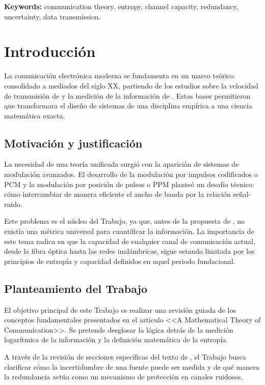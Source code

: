 \documentclass[11pt,a4paper,spanish]{book}
\begin{document}
\vspace{0.5cm}
{\bf Keywords:} communication theory, entropy, channel capacity, redundancy, uncertainty, data transmission.
\mainmatter

\chapter{Introducción}

La comunicación electrónica moderna se fundamenta en un marco teórico consolidado a mediados del siglo XX, partiendo de los estudios sobre la velocidad de transmisión de \citet{nyquist1928} y la medición de la información de \citet{hartley1928}. Estas bases permitieron que \citet{shannon1948} transformara el diseño de sistemas de una disciplina empírica a una ciencia matemática exacta.

\section{Motivación y justificación}

La necesidad de una teoría unificada surgió con la aparición de sistemas de modulación avanzados. El desarrollo de la modulación por impulsos codificados o PCM \citep{reeves1942} y la modulación por posición de pulsos o PPM \citep{deloraine1941} planteó un desafío técnico: cómo intercambiar de manera eficiente el ancho de banda por la relación señal-ruido. 

Este problema es el núcleo del Trabajo, ya que, antes de la propuesta de \citet{shannon1948}, no existía una métrica universal para cuantificar la información. La importancia de este tema radica en que la capacidad de cualquier canal de comunicación actual, desde la fibra óptica hasta las redes inalámbricas, sigue estando limitada por los principios de entropía y capacidad definidos en aquel periodo fundacional.

\section{Planteamiento del Trabajo}

El objetivo principal de este Trabajo es realizar una revisión guiada de los conceptos fundamentales presentados en el artículo <<A Mathematical Theory of Communication>>. Se pretende desglosar la lógica detrás de la medición logarítmica de la información y la definición matemática de la entropía. 

A través de la revisión de secciones específicas del texto de \citet{shannon1948}, el Trabajo busca clarificar cómo la incertidumbre de una fuente puede ser medida y de qué manera la redundancia actúa como un mecanismo de protección en canales ruidosos.
\end{document}
